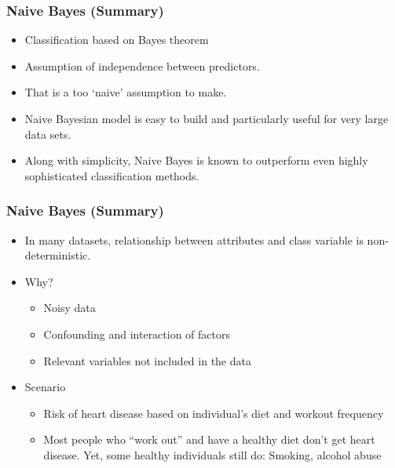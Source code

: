 \begin{frame}[fragile]\frametitle{Naive Bayes (Summary)}
\begin{itemize}
\item Classification based on Bayes theorem
\item Assumption of independence between predictors.
\item That is a too `naive' assumption to make.
\item Naive Bayesian model is easy to build and particularly useful for very large data sets. 
\item Along with simplicity, Naive Bayes is known to outperform even highly sophisticated classification methods.
\end{itemize}
\end{frame}


\begin{frame}[fragile]\frametitle{Naive Bayes (Summary)}
\begin{itemize}
\item In many datasets, relationship between attributes and class variable is non-deterministic.
\item Why?
	\begin{itemize}
	\item Noisy data
	\item Confounding and interaction of factors
	\item Relevant variables not included in the data
	\end{itemize}

\item Scenario
	\begin{itemize}
	\item Risk of heart disease based on individual's diet and workout frequency
	\item Most people who ``work out'' and have a healthy diet don't get heart disease. Yet, some healthy individuals still do: Smoking, alcohol abuse
	\end{itemize}
\end{itemize}
\end{frame}